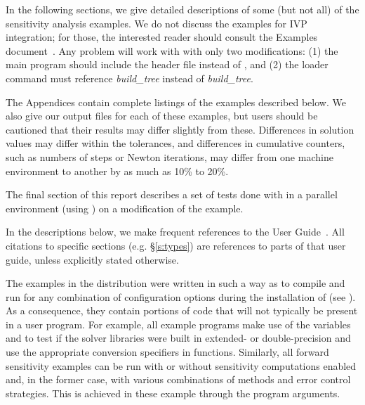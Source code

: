 In the following sections, we give detailed descriptions of some (but
not all) of the sensitivity analysis examples. We do not discuss the 
examples for IVP integration; for those, the interested reader should consult
the {\cvode} Examples document~\cite{cvode2.4.0_ex}. Any {\cvode} problem
will work with {\cvodes} with only two modifications: (1) the main program
should include the header file  instead of , and
(2) the loader command must reference
{\em build\_tree} instead of
{\em build\_tree}.

The Appendices contain complete listings
of the examples described below.  We also give our output files for
each of these examples, but users should be cautioned that their
results may differ slightly from these.  Differences in solution
values may differ within the tolerances, and differences in cumulative
counters, such as numbers of steps or Newton iterations, may differ
from one machine environment to another by as much as 10\% to 20\%.

The final section of this report describes a set of tests done with
{\cvodes} in a parallel environment (using {\nvecp}) on a modification of
the  example.

In the descriptions below, we make frequent references to the {\cvodes}
User Guide~\cite{cvodes2.3.0_ug}.  All citations to specific sections
(e.g. \S\ref{s:types}) are references to parts of that user guide, unless
explicitly stated otherwise.

\vspace{0.2in}
The examples in the {\cvodes} distribution were written in such a way as
to compile and run for any combination of configuration options during
the installation of {\sundials} (see ). As a consequence,
they contain portions of code that will not typically be present in a
user program. For example, all example programs make use of the
variables  and 
to test if the solver libraries
were built in extended- or double-precision and use the appropriate conversion 
specifiers in  functions. Similarly, all forward sensitivity
examples can be run with or without sensitivity computations enabled and,
in the former case, with various combinations of methods and error control 
strategies. This is achieved in these example through the program arguments.

